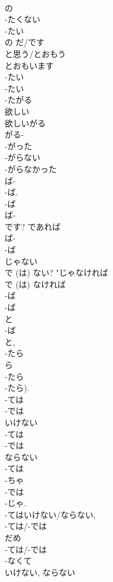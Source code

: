 \documentclass[8pt]{extreport}
\begin{document}
\begin{CJK}{UTF8}{min}
\\	の 
\\	-たくない 
\\	-たい 
\\	の だ/です
\\	と思う/とおもう 
\\	とおもいます
\\	-たい　
\\	-たい 
\\	-たがる 
\\	欲しい 
\\	欲しいがる 
\\	がる-
\\	-がった 
\\	-がらない 
\\	-がらなかった	
\\	ば-
\\	-ば.	
\\	-ば 
\\	ば-
\\	です?	であれば	
\\	ば-
\\	-ば 
\\	じゃない 
\\	で (は) ない?	"じゃなければ 
\\	で (は) なければ 
\\	-ば 
\\	-ば 
\\	と	
\\	-ば 
\\	と, 
\\	-たら 
\\	ら 
\\	-たら 
\\	-たら).	
\\	-ては 
\\	-では 
\\	いけない 
\\	-ては 
\\	-では 
\\	ならない 
\\	-ては 
\\	-ちゃ 
\\	-では 
\\	-じゃ.	
\\	-てはいけない/ならない, 
\\	-ては/-では 
\\	だめ	
\\	-ては/-では 
\\	-なくて 
\\	いけない, ならない 

\end{CJK}
\end{document}
